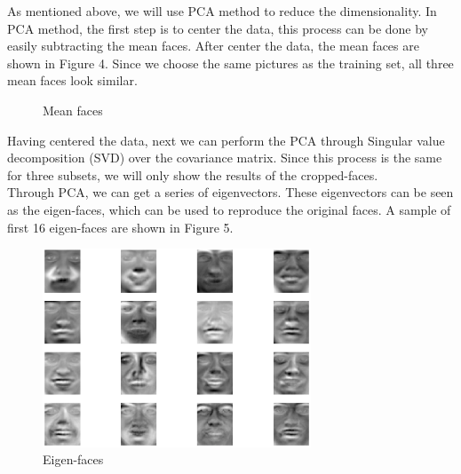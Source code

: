 \documentclass[11pt,letterpaper]{article}
\begin{document}
As mentioned above, we will use PCA method to reduce the dimensionality. In PCA method, the first step is to center the data, this process can be done by easily subtracting the mean faces. After center the data, the mean faces are shown in Figure 4. Since we choose the same pictures as the training set, all three mean faces look similar.\\

\begin{figure}[H]
\centering
{}
\caption{Mean faces}
\label{Fig1.lable}
\end{figure}

Having centered the data, next we can perform the PCA through Singular value decomposition (SVD) over the covariance matrix. Since this process is the same for three subsets, we will only show the results of the cropped-faces. \\

Through PCA, we can get a series of eigenvectors. These eigenvectors can be seen as the eigen-faces, which can be used to reproduce the original faces. A sample of first 16 eigen-faces are shown in Figure 5.\\

\begin{figure}[H]
\centering
\includegraphics[width=80mm]{eigenFace.png}
\caption{Eigen-faces}
\label{Fig2.lable}
\end{figure}
\end{document}
